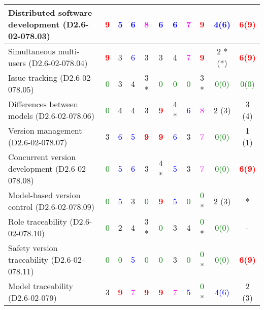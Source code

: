 \begin{tabular}{|l | c | c | c | c | c | c | c | c | c | c |}
\hline
Distributed software development (D2.6-02-078.03)   & \textcolor{red}{\textbf{9}} & \textcolor{blue}{5} & \textcolor{blue}{6} & \textcolor{magenta}{8} & \textcolor{blue}{6} & \textcolor{blue}{6} & \textcolor{magenta}{7} & \textcolor{red}{\textbf{9}} & \textcolor{blue}{4(6)}  & \textcolor{red}{\textbf{6(9)}}  \\
\hline
Simultaneous multi-users (D2.6-02-078.04)   & \textcolor{red}{\textbf{9}} & 3     & \textcolor{blue}{6} & 3     & 3     & 4     & \textcolor{magenta}{7} & \textcolor{red}{\textbf{9}} & 2 *(*) & \textcolor{red}{\textbf{6(9)}}  \\
\hline
Issue tracking (D2.6-02-078.05)  & \textcolor{green}{0} & 3     & 4     & 3    * & \textcolor{green}{0} & \textcolor{green}{0} & \textcolor{green}{0} & 3    * & \textcolor{green}{0(0)}  & \textcolor{green}{0(0)}  \\
\hline
Differences between models (D2.6-02-078.06)  & \textcolor{green}{0} & 4     & 4     & 3     & \textcolor{red}{\textbf{9}} & 4    * & \textcolor{blue}{6} & \textcolor{magenta}{8} & 2 (3) & 3 (4) \\
\hline
Version management (D2.6-02-078.07)  & 3     & \textcolor{blue}{6} & \textcolor{blue}{5} & \textcolor{red}{\textbf{9}} & \textcolor{red}{\textbf{9}} & \textcolor{blue}{6} & 3     & \textcolor{magenta}{7} & \textcolor{green}{0(0)}  & 1 (1) \\
\hline
Concurrent version development (D2.6-02-078.08)  & \textcolor{green}{0} & \textcolor{blue}{5} & \textcolor{blue}{6} & 3     & 4    * & \textcolor{blue}{5} & 3     & \textcolor{magenta}{7} & \textcolor{green}{0(0)}  & \textcolor{red}{\textbf{6(9)}}  \\
\hline
Model-based version control (D2.6-02-078.09)  & \textcolor{green}{0} & \textcolor{blue}{5} & 3     & \textcolor{green}{0} & \textcolor{red}{\textbf{9}} & \textcolor{blue}{5} & \textcolor{green}{0} & \textcolor{green}{0} * & 2 (3) & * \\
\hline
Role traceability (D2.6-02-078.10)  & \textcolor{green}{0} & 2     & 4     & 3    * & \textcolor{green}{0} & 3     & 4     & \textcolor{green}{0} * & \textcolor{green}{0(0)}  & - \\
\hline
Safety version traceability (D2.6-02-078.11)  & \textcolor{green}{0} & \textcolor{green}{0} & \textcolor{blue}{5} & \textcolor{green}{0} & \textcolor{green}{0} & 3     & \textcolor{green}{0} & \textcolor{green}{0} * & \textcolor{green}{0(0)}  & \textcolor{red}{\textbf{6(9)}}  \\
\hline
Model traceability (D2.6-02-079) & 3     & \textcolor{red}{\textbf{9}} & \textcolor{magenta}{7} & \textcolor{red}{\textbf{9}} & \textcolor{red}{\textbf{9}} & \textcolor{magenta}{7} & \textcolor{blue}{5} & \textcolor{green}{0} * & \textcolor{blue}{4(6)}  & 2 (3) \\

\end{tabular}
